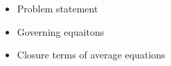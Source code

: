 \begin{itemize}
    \item Problem statement  
    \item Governing equaitons 
    \item Closure terms of average equations
\end{itemize}